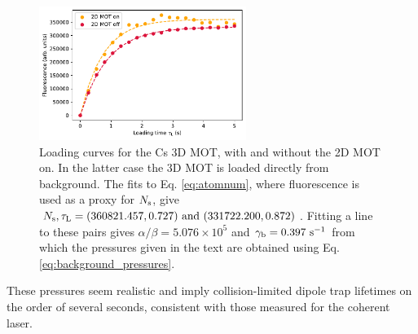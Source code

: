 \begin{figure}
    \centering
    \includegraphics[width=0.6\textwidth]{Images/CsMOT_loading_curves.pdf}
    \caption{Loading curves for the Cs 3D MOT, with and without the 2D MOT on. In the latter case the 3D MOT is loaded directly from background. The fits to Eq. \ref{eq:atomnum}, where fluorescence is used as a proxy for $N_{\text s}$, give $N_{\text s},\tau_{\text L}=(360821.457,0.727)~\text{and}~(331722.200,0.872)$. Fitting a line to these pairs gives $\alpha/\beta=5.076\times10^5$ and $\gamma_{\text b}=0.397 ~\text{s}^{-1}$ from which the pressures given in the text are obtained using Eq. \ref{eq:background_pressures}.}
    \label{fig:CsMOT_loading}
\end{figure}

These pressures seem realistic and imply collision-limited dipole trap lifetimes on the order of several seconds, consistent with those measured for the coherent laser.

% 
%
